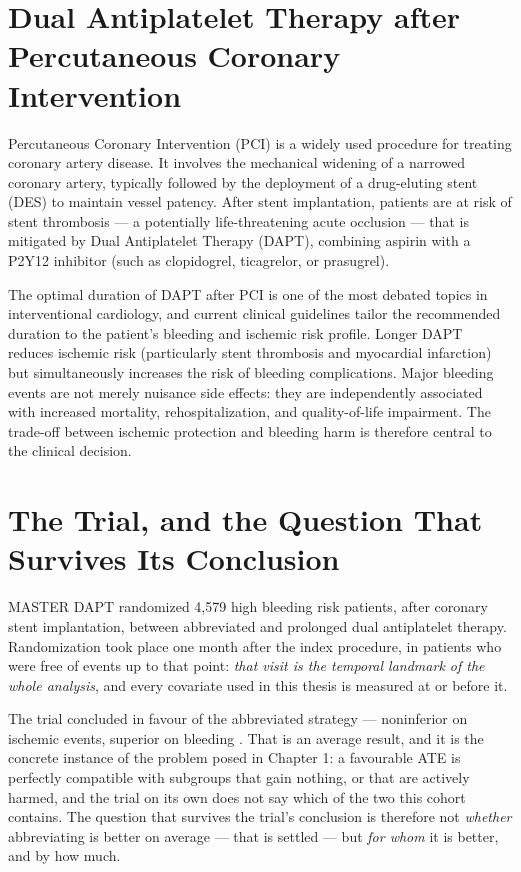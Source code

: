 
\section{Dual Antiplatelet Therapy after Percutaneous Coronary Intervention}

Percutaneous Coronary Intervention (PCI) is a widely used procedure for
treating coronary artery disease. It involves the mechanical widening of
a narrowed coronary artery, typically followed by the deployment of a
drug-eluting stent (DES) to maintain vessel patency. After stent
implantation, patients are at risk of stent thrombosis — a potentially
life-threatening acute occlusion — that is mitigated by Dual Antiplatelet
Therapy (DAPT), combining aspirin with a P2Y12 inhibitor (such as clopidogrel,
ticagrelor, or prasugrel).

The optimal duration of DAPT after PCI is one of the most debated topics in
interventional cardiology, and current clinical guidelines
\citep{esc2023acs} tailor the recommended duration to the patient's bleeding
and ischemic risk profile. Longer DAPT reduces ischemic risk (particularly
stent thrombosis and myocardial infarction) but simultaneously increases the
risk of bleeding complications. Major bleeding events are not merely
nuisance side effects: they are independently associated with increased
mortality, rehospitalization, and quality-of-life impairment. The trade-off
between ischemic protection and bleeding harm is therefore central to the
clinical decision.


\section{The Trial, and the Question That Survives Its Conclusion}

MASTER DAPT \citep{valgimigli2021masterdapt} randomized 4,579 high bleeding risk patients, after coronary
stent implantation, between abbreviated and prolonged dual antiplatelet
therapy. Randomization took place one month after the index procedure, in
patients who were free of events up to that point: \emph{that visit is the
temporal landmark of the whole analysis}, and every covariate used in this
thesis is measured at or before it.

The trial concluded in favour of the abbreviated strategy — noninferior on
ischemic events, superior on bleeding \citep{valgimigli2021masterdapt}. That is an average result, and it is
the concrete instance of the problem posed in Chapter 1: a favourable ATE is
perfectly compatible with subgroups that gain nothing, or that are actively
harmed, and the trial on its own does not say which of the two this cohort
contains. The question that survives the trial's conclusion is therefore not
\emph{whether} abbreviating is better on average — that is settled — but
\emph{for whom} it is better, and by how much.

